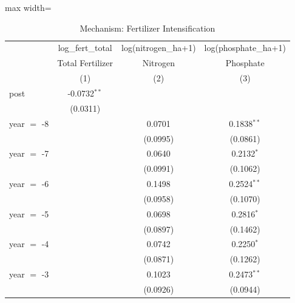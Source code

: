 
\begin{table}[!ht]
   \caption{\label{tab:mechanism} Mechanism: Fertilizer Intensification}
   \bigskip
   \centering
   \small
   \begin{adjustbox}{max width=\textwidth}
   \begin{tabular}{lccc}
      \toprule
                                & log\_fert\_total   & log(nitrogen\_ha+1)  & log(phosphate\_ha+1)\\   
                                & Total Fertilizer   & Nitrogen             & Phosphate \\   
                                & (1)                & (2)                  & (3)\\  
      \midrule 
      post                      & -0.0732$^{**}$     &                      &   \\   
                                & (0.0311)           &                      &   \\   
      year $=$ -8               &                    & 0.0701               & 0.1838$^{**}$\\   
                                &                    & (0.0995)             & (0.0861)\\   
      year $=$ -7               &                    & 0.0640               & 0.2132$^{*}$\\   
                                &                    & (0.0991)             & (0.1062)\\   
      year $=$ -6               &                    & 0.1498               & 0.2524$^{**}$\\   
                                &                    & (0.0958)             & (0.1070)\\   
      year $=$ -5               &                    & 0.0698               & 0.2816$^{*}$\\   
                                &                    & (0.0897)             & (0.1462)\\   
      year $=$ -4               &                    & 0.0742               & 0.2250$^{*}$\\   
                                &                    & (0.0871)             & (0.1262)\\   
      year $=$ -3               &                    & 0.1023               & 0.2473$^{**}$\\   
                                &                    & (0.0926)             & (0.0944)\\   

\end{tabular}
\end{adjustbox}
\end{table}
